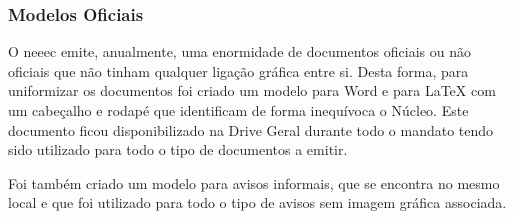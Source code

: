 
\subsubsection{Modelos Oficiais}

O \acrshort{neeec} emite, anualmente, uma enormidade de documentos oficiais ou não oficiais que não tinham qualquer ligação gráfica entre si. Desta forma, para uniformizar os documentos foi criado um modelo para Word e para LaTeX com um cabeçalho e rodapé que identificam de forma inequívoca o Núcleo. Este documento ficou disponibilizado na Drive Geral durante todo o mandato tendo sido utilizado para todo o tipo de documentos a emitir.

Foi também criado um modelo para avisos informais, que se encontra no mesmo local e que foi utilizado para todo o tipo de avisos sem imagem gráfica associada.